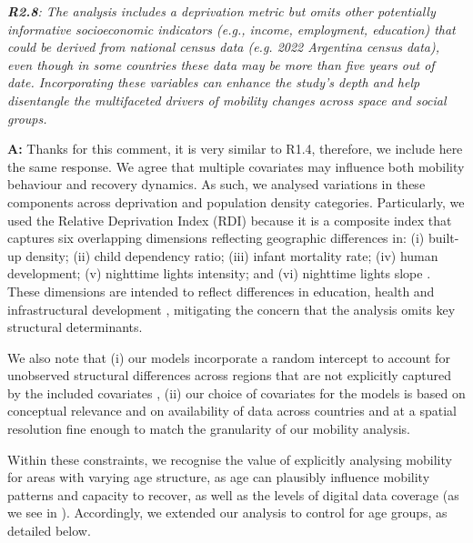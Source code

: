 \documentclass[12pt,a4paper,oneside, reqno]{amsart}
\begin{document}
\setlength{\leftskip}{0cm} \textit{\textbf{R2.8}: The analysis includes a deprivation metric but omits other potentially informative socioeconomic indicators (e.g., income, employment, education) that could be derived from national census data (e.g. 2022 Argentina census data), even though in some countries these data may be more than five years out of date. Incorporating these variables can enhance the study's depth and help disentangle the multifaceted drivers of mobility changes across space and social groups.}
  
\setlength{\leftskip}{1cm}\textbf{A:} Thanks for this comment, it is very similar to R1.4, therefore, we include here the same response. We agree that multiple covariates may influence both mobility behaviour and recovery dynamics. As such, we analysed variations in these components across deprivation and population density categories. Particularly, we used the Relative Deprivation Index (RDI) because it is a composite index that captures six overlapping dimensions reflecting geographic differences in: (i) built-up density; (ii) child dependency ratio; (iii) infant mortality rate; (iv) human development; (v) nighttime lights intensity; and (vi) nighttime lights slope \parencite{RDI2022}. These dimensions are intended to reflect differences in education, health and infrastructural development \parencite{RDI2022}, mitigating the concern that the analysis omits key structural determinants. 

We also note that (i) our models incorporate a random intercept to account for unobserved structural differences across regions that are not explicitly captured by the included covariates \parencite{gelman2007data}, (ii) our choice of covariates for the models is based on conceptual relevance and on availability of data across countries and at a spatial resolution fine enough to match the granularity of our mobility analysis. 

Within these constraints, we recognise the value of explicitly analysing mobility for areas with varying age structure, as age can plausibly influence mobility patterns \parencite{schwartz1976migration} and capacity to recover, as well as the levels of digital data coverage (as we see in \parencite{cabrera2025bias}). Accordingly, we extended our analysis to control for age groups, as detailed below.
\end{document}
